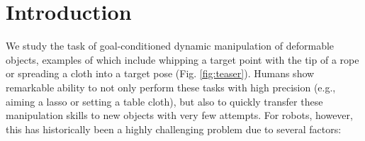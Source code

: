 
\section{Introduction}
We study the task of goal-conditioned dynamic manipulation of deformable objects, examples of which include whipping a target point with the tip of a rope or spreading a cloth into a target pose (Fig. \ref{fig:teaser}). 
Humans show remarkable ability to not only perform these tasks with high precision (e.g., aiming a lasso or setting a table cloth), but also to quickly transfer these manipulation skills to new objects with very few attempts. 
For robots, however, this has historically been a highly challenging problem due to several factors:

